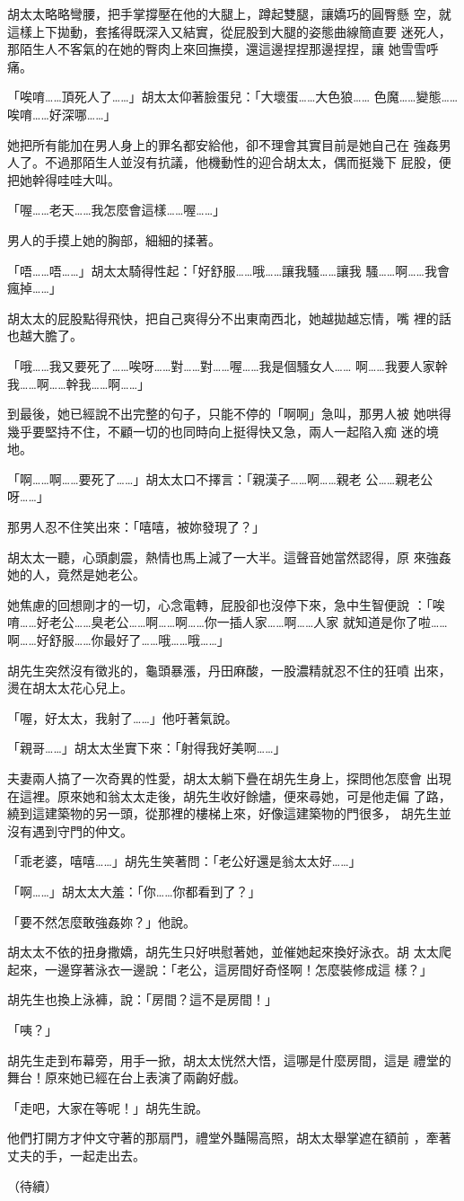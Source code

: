 胡太太略略彎腰，把手掌撐壓在他的大腿上，蹲起雙腿，讓嬌巧的圓臀懸
空，就這樣上下拋動，套搖得既深入又結實，從屁股到大腿的姿態曲線簡直要
迷死人，那陌生人不客氣的在她的臀肉上來回撫摸，還這邊捏捏那邊捏捏，讓
她雪雪呼痛。

「唉唷……頂死人了……」胡太太仰著臉蛋兒：「大壞蛋……大色狼……
色魔……變態……唉唷……好深哪……」

她把所有能加在男人身上的罪名都安給他，卻不理會其實目前是她自己在
強姦男人了。不過那陌生人並沒有抗議，他機動性的迎合胡太太，偶而挺幾下
屁股，便把她幹得哇哇大叫。

「喔……老天……我怎麼會這樣……喔……」

男人的手摸上她的胸部，細細的揉著。

「唔……唔……」胡太太騎得性起：「好舒服……哦……讓我騷……讓我
騷……啊……我會瘋掉……」

胡太太的屁股點得飛快，把自己爽得分不出東南西北，她越拋越忘情，嘴
裡的話也越大膽了。

「哦……我又要死了……唉呀……對……對……喔……我是個騷女人……
啊……我要人家幹我……啊……幹我……啊……」

到最後，她已經說不出完整的句子，只能不停的「啊啊」急叫，那男人被
她哄得幾乎要堅持不住，不顧一切的也同時向上挺得快又急，兩人一起陷入痴
迷的境地。

「啊……啊……要死了……」胡太太口不擇言：「親漢子……啊……親老
公……親老公呀……」

那男人忍不住笑出來：「嘻嘻，被妳發現了？」

胡太太一聽，心頭劇震，熱情也馬上減了一大半。這聲音她當然認得，原
來強姦她的人，竟然是她老公。

她焦慮的回想剛才的一切，心念電轉，屁股卻也沒停下來，急中生智便說
：「唉唷……好老公……臭老公……啊……啊……你一插人家……啊……人家
就知道是你了啦……啊……好舒服……你最好了……哦……哦……」

胡先生突然沒有徵兆的，龜頭暴漲，丹田麻酸，一股濃精就忍不住的狂噴
出來，燙在胡太太花心兒上。

「喔，好太太，我射了……」他吁著氣說。

「親哥……」胡太太坐實下來：「射得我好美啊……」

夫妻兩人搞了一次奇異的性愛，胡太太躺下疊在胡先生身上，探問他怎麼會
出現在這裡。原來她和翁太太走後，胡先生收好餘燼，便來尋她，可是他走偏
了路，繞到這建築物的另一頭，從那裡的樓梯上來，好像這建築物的門很多，
胡先生並沒有遇到守門的仲文。

「乖老婆，嘻嘻……」胡先生笑著問：「老公好還是翁太太好……」

「啊……」胡太太大羞：「你……你都看到了？」

「要不然怎麼敢強姦妳？」他說。

胡太太不依的扭身撒嬌，胡先生只好哄慰著她，並催她起來換好泳衣。胡
太太爬起來，一邊穿著泳衣一邊說：「老公，這房間好奇怪啊！怎麼裝修成這
樣？」

胡先生也換上泳褲，說：「房間？這不是房間！」

「咦？」

胡先生走到布幕旁，用手一掀，胡太太恍然大悟，這哪是什麼房間，這是
禮堂的舞台！原來她已經在台上表演了兩齣好戲。

「走吧，大家在等呢！」胡先生說。

他們打開方才仲文守著的那扇門，禮堂外豔陽高照，胡太太舉掌遮在額前
，牽著丈夫的手，一起走出去。


（待續）










